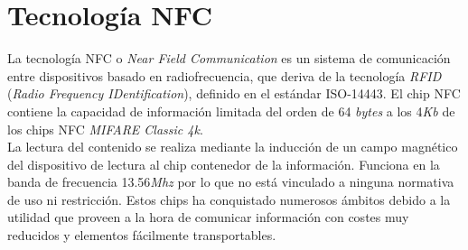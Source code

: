 \documentclass[../PFC.tex]{subfiles}
\begin{document}
\section{Tecnología NFC}
\label{Tecnología NFC}

La tecnología NFC o \textit{Near Field Communication} es un sistema de comunicación entre dispositivos basado en radiofrecuencia, que deriva de la tecnología \textit{RFID} (\textit{Radio Frequency IDentification}), definido en el estándar ISO-14443\cite{iso14443}. El chip NFC contiene la capacidad de información limitada del orden de 64 \textit{bytes} a los 4\textit{Kb} de los chips NFC \textit{MIFARE Classic 4k}.
\*
\vspace{0.5515cm}
\\
La lectura del contenido se realiza mediante la inducción de un campo magnético del dispositivo de lectura al chip contenedor de la información. Funciona en la banda de frecuencia 13.56\textit{Mhz} por lo que no está vinculado a ninguna normativa de uso ni restricción. Estos chips ha conquistado numerosos ámbitos debido a la utilidad que proveen a la hora de comunicar información con costes muy reducidos y elementos fácilmente transportables.
\end{document}
